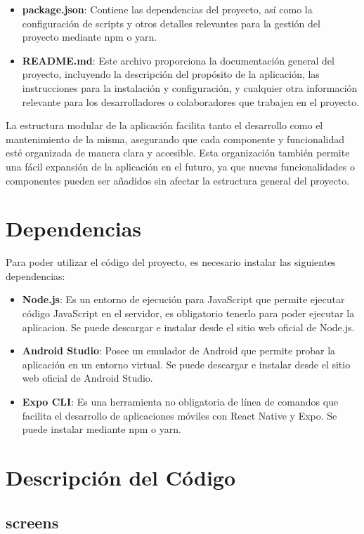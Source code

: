 \documentclass[a4paper,12pt]{article}
\begin{document}
\begin{itemize}
    \item \textbf{package.json}: Contiene las dependencias del proyecto, así como la configuración de scripts y otros detalles relevantes para la gestión del proyecto mediante npm o yarn.
    \item \textbf{README.md}: Este archivo proporciona la documentación general del proyecto, incluyendo la descripción del propósito de la aplicación, las instrucciones para la instalación y configuración, y cualquier otra información relevante para los desarrolladores o colaboradores que trabajen en el proyecto.
\end{itemize}

La estructura modular de la aplicación facilita tanto el desarrollo como el mantenimiento de la misma, asegurando que cada componente y funcionalidad esté organizada de manera clara y accesible. Esta organización también permite una fácil expansión de la aplicación en el futuro, ya que nuevas funcionalidades o componentes pueden ser añadidos sin afectar la estructura general del proyecto.


\section{Dependencias}

Para poder utilizar el código del proyecto, es necesario instalar las siguientes dependencias:

\begin{itemize}
    \item \textbf{Node.js}: Es un entorno de ejecución para JavaScript que permite ejecutar código JavaScript en el servidor, es obligatorio tenerlo para poder ejecutar la aplicacion. Se puede descargar e instalar desde el sitio web oficial de Node.js.
    \item \textbf{Android Studio}: Posee un emulador de Android que permite probar la aplicación en un entorno virtual. Se puede descargar e instalar desde el sitio web oficial de Android Studio.
    \item \textbf{Expo CLI}: Es una herramienta no obligatoria de línea de comandos que facilita el desarrollo de aplicaciones móviles con React Native y Expo. Se puede instalar mediante npm o yarn.
\end{itemize}


\section{Descripción del Código}
\subsection{screens}
\end{document}
